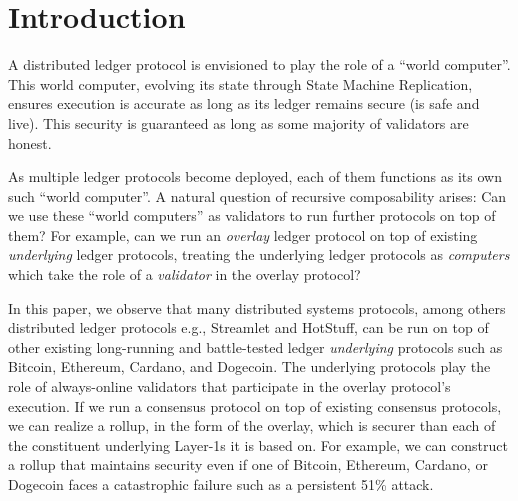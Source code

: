 \section{Introduction}

A distributed ledger protocol is envisioned to play the role of a ``world computer''.
This world computer, evolving its state through State Machine Replication, ensures
execution is accurate as long as its ledger remains secure (is safe and live).
This security is guaranteed as long as some majority of validators are honest.

As multiple ledger protocols become deployed, each of them functions as its own
such ``world computer''. A natural question of recursive composability arises:
Can we use these ``world computers'' as validators to run further protocols on
top of them? For example, can we run an \emph{overlay} ledger protocol on top
of existing \emph{underlying} ledger protocols, treating the underlying ledger
protocols as \emph{computers} which take the role of a \emph{validator} in the
overlay protocol?

In this paper, we observe that many distributed systems protocols, among others
distributed ledger protocols e.g., Streamlet and HotStuff, can be run
on top of other existing long-running and battle-tested ledger \emph{underlying}
protocols such as Bitcoin, Ethereum, Cardano, and Dogecoin. The underlying protocols
play the role of always-online validators that participate in the overlay protocol's
execution. If we run a consensus protocol on top of existing consensus protocols,
we can realize a rollup, in the form of the overlay, which is securer than each
of the constituent underlying Layer-1s it is based on. For example, we can construct
a rollup that maintains security even if one of Bitcoin, Ethereum, Cardano, or Dogecoin
faces a catastrophic failure such as a persistent 51\% attack.

